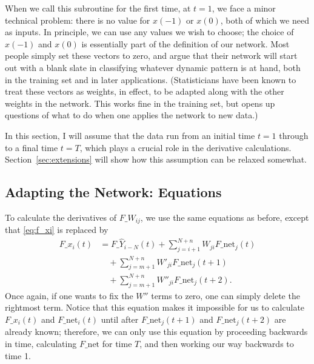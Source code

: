 \documentclass[journal]{IEEEtran} %
\begin{document}
When we call this subroutine for the first time, at $t=1$, we face a minor technical problem: there is no value for $x(-1)$ or $x(0)$, both of which we need as inputs. In principle, we can use any values we wish to choose; the choice of $x(-1)$ and $x(0)$ is essentially part of the definition of our network. Most people simply set these vectors to zero, and argue that their network will start out with a blank slate in classifying whatever dynamic pattern is at hand, both in the training set and in later applications. (Statisticians have been known to treat these vectors as weights, in effect, to be adapted along with the other weights in the network. This works fine in the training set, but opens up questions of what to do when one applies the network to new data.)

In this section, I will assume that the data run from an initial time $t=1$ through to a final time $t=T$, which plays a crucial role in the derivative calculations. Section~\ref{sec:extensions} will show how this assumption can be relaxed somewhat.

\subsection{Adapting the Network: Equations}
To calculate the derivatives of $F\_W_{ij}$, we use the same equations as before, except that \eqref{eq:f_xi} is replaced by
\begin{align}
    F\_x_i(t) &= F\_\hat{Y}_{i-N}(t) + \sum_{j=i+1}^{N+n} W_{ji} F\_\text{net}_j(t) \nonumber \\
             & \quad + \sum_{j=m+1}^{N+n} W'_{ji} F\_\text{net}_j(t+1) \nonumber \\
             & \quad + \sum_{j=m+1}^{N+n} W''_{ji} F\_\text{net}_j(t+2). \label{eq:f_xi_recurrent}
\end{align}
Once again, if one wants to fix the $W''$ terms to zero, one can simply delete the rightmost term.
Notice that this equation makes it impossible for us to calculate $F\_x_i(t)$ and $F\_\text{net}_i(t)$ until after $F\_\text{net}_j(t+1)$ and $F\_\text{net}_j(t+2)$ are already known; therefore, we can only use this equation by proceeding backwards in time, calculating $F\_\text{net}$ for time $T$, and then working our way backwards to time 1.
\end{document}
